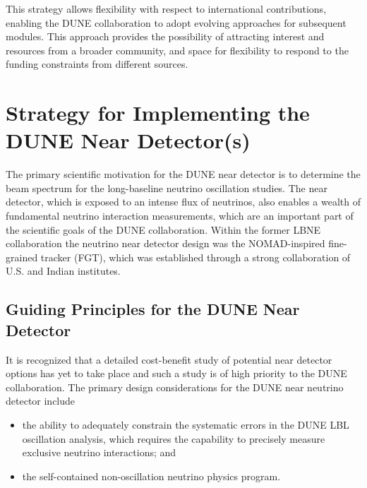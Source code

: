 This strategy allows flexibility with respect to international contributions, enabling the DUNE collaboration to
adopt evolving approaches for subsequent modules. This approach provides the possibility of attracting interest 
and resources from a broader community, and space for flexibility to respond to 
the funding constraints from different sources. 

\section{Strategy for Implementing the DUNE Near Detector(s)}
\label{v1ch:strategyND}

 The primary scientific motivation for 
the DUNE near detector %
is to determine the beam spectrum for the long-baseline 
neutrino oscillation studies. The near detector, which is exposed to an intense 
flux of neutrinos, also enables a wealth of fundamental neutrino 
interaction measurements, which are an important part of the  scientific 
goals of the DUNE collaboration. Within the former LBNE collaboration the neutrino 
near detector design was the NOMAD-inspired fine-grained tracker (FGT), which 
was established through a strong collaboration of U.S. and Indian institutes.


\subsection{Guiding Principles for the DUNE Near Detector}

It is recognized that a detailed cost-benefit study of potential near detector options 
has yet to take place and such a study is of high priority to the DUNE collaboration. The
primary design considerations for the DUNE near neutrino detector include
\begin{itemize}

\item  %
the 
ability to adequately constrain the systematic errors in the DUNE LBL oscillation 
analysis, which requires the capability to precisely measure exclusive neutrino
interactions; and

\item %
the self-contained non-oscillation 
neutrino physics program.

\end{itemize}

